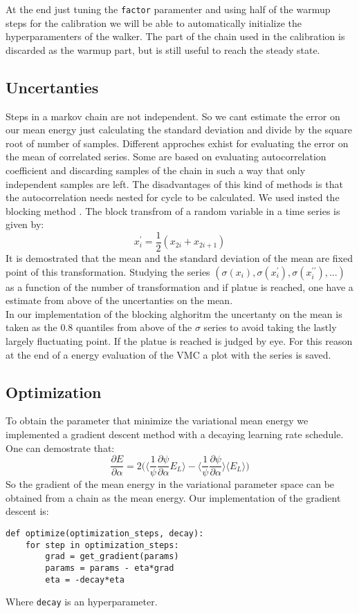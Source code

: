\documentclass{article}
\begin{document}
At the end just tuning the \texttt{factor} paramenter and using half of the warmup steps for the calibration we will be able to automatically initialize the hyperparamenters of the walker. The part of the chain used in the calibration is discarded as the warmup part, but is still useful to reach the steady state.


\subsection{Uncertanties}
Steps in a markov chain are not independent. So we cant estimate the error on our mean energy just calculating the standard deviation and divide by the square root of number of samples. Different approches exhist for evaluating the error on the mean of correlated series. Some are based on evaluating autocorrelation coefficient and discarding samples of the chain in such a way that only independent samples are left. The disadvantages of this kind of methods is that the autocorrelation needs nested for cycle to be calculated. We used insted the blocking method \cite{Block}. The block transfrom of a random variable in a time series is given by:
\begin{equation}
    x^\prime_i = \frac{1}{2}(x_{2i}+x_{2i+1})
\end{equation}
It is demostrated that the mean and the standard deviation of the mean are fixed point of this transformation. Studying the series $(\sigma({x_i}), \sigma({x^\prime_i}),\sigma({x^{\prime \prime}_i}), ...)$ as a function of the number of transformation and if platue is reached, one have a estimate from above of the uncertanties on the mean.\\ 

In our implementation of the blocking alghoritm the uncertanty on the mean is taken as the 0.8 quantiles from above of the $\sigma$ series to avoid taking the lastly largely fluctuating point. If the platue is reached is judged by eye. For this reason at the end of a energy evaluation of the VMC a plot with the series is saved.

\subsection{Optimization}
To obtain the parameter that minimize the variational mean energy we implemented a gradient descent method with a decaying learning rate schedule. One can demostrate that:
\begin{equation}
    \frac{\partial E}{\partial \alpha} = 2\Big(\langle \frac{1}{\psi}\frac{\partial \psi}{\partial \alpha} E_L \rangle - \langle  \frac{1}{\psi}\frac{\partial \psi}{\partial \alpha} \rangle \langle E_L \rangle \Big)
\end{equation}
So the gradient of the mean energy in the variational parameter space can be obtained from a chain as the mean energy. Our implementation of the gradient descent is:
\begin{lstlisting}
def optimize(optimization_steps, decay):
    for step in optimization_steps:
        grad = get_gradient(params)
        params = params - eta*grad
        eta = -decay*eta
\end{lstlisting}
Where \texttt{decay} is an hyperparameter.
\end{document}
